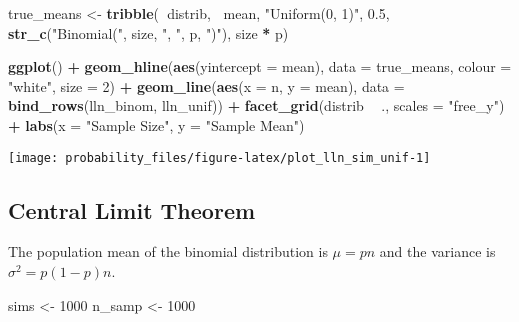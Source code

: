 \documentclass[]{book}
\newenvironment{Shaded}{\begin{snugshade}}{\end{snugshade}}
\newcommand{\DataTypeTok}[1]{\textcolor[rgb]{0.13,0.29,0.53}{#1}}
\newcommand{\DecValTok}[1]{\textcolor[rgb]{0.00,0.00,0.81}{#1}}
\newcommand{\FloatTok}[1]{\textcolor[rgb]{0.00,0.00,0.81}{#1}}
\newcommand{\KeywordTok}[1]{\textcolor[rgb]{0.13,0.29,0.53}{\textbf{#1}}}
\newcommand{\NormalTok}[1]{#1}
\newcommand{\OperatorTok}[1]{\textcolor[rgb]{0.81,0.36,0.00}{\textbf{#1}}}
\newcommand{\StringTok}[1]{\textcolor[rgb]{0.31,0.60,0.02}{#1}}
\theoremstyle{definition}
\theoremstyle{definition}
\theoremstyle{definition}
\theoremstyle{remark}
\begin{document}
\begin{Shaded}
\begin{Highlighting}[]
\NormalTok{true_means <-}
\StringTok{  }\KeywordTok{tribble}\NormalTok{(}\OperatorTok{~}\NormalTok{distrib, }\OperatorTok{~}\NormalTok{mean,}
          \StringTok{"Uniform(0, 1)"}\NormalTok{, }\FloatTok{0.5}\NormalTok{,}
          \KeywordTok{str_c}\NormalTok{(}\StringTok{"Binomial("}\NormalTok{, size, }\StringTok{", "}\NormalTok{, p, }\StringTok{")"}\NormalTok{), size }\OperatorTok{*}\StringTok{ }\NormalTok{p)}

\KeywordTok{ggplot}\NormalTok{() }\OperatorTok{+}
\StringTok{  }\KeywordTok{geom_hline}\NormalTok{(}\KeywordTok{aes}\NormalTok{(}\DataTypeTok{yintercept =}\NormalTok{ mean), }\DataTypeTok{data =}\NormalTok{ true_means,}
             \DataTypeTok{colour =} \StringTok{"white"}\NormalTok{, }\DataTypeTok{size =} \DecValTok{2}\NormalTok{) }\OperatorTok{+}
\StringTok{  }\KeywordTok{geom_line}\NormalTok{(}\KeywordTok{aes}\NormalTok{(}\DataTypeTok{x =}\NormalTok{ n, }\DataTypeTok{y =}\NormalTok{ mean),}
            \DataTypeTok{data =} \KeywordTok{bind_rows}\NormalTok{(lln_binom, lln_unif)) }\OperatorTok{+}
\StringTok{  }\KeywordTok{facet_grid}\NormalTok{(distrib }\OperatorTok{~}\StringTok{ }\NormalTok{., }\DataTypeTok{scales =} \StringTok{"free_y"}\NormalTok{) }\OperatorTok{+}
\StringTok{  }\KeywordTok{labs}\NormalTok{(}\DataTypeTok{x =} \StringTok{"Sample Size"}\NormalTok{, }\DataTypeTok{y =} \StringTok{"Sample Mean"}\NormalTok{)}
\end{Highlighting}
\end{Shaded}

\begin{center}\texttt{[image: probability\_files/figure-latex/plot\_lln\_sim\_unif-1]} \end{center}

\hypertarget{central-limit-theorem}{%
\subsection{Central Limit Theorem}\label{central-limit-theorem}}

The population mean of the binomial distribution is \(\mu = p n\) and
the variance is \(\sigma^2 = p (1 - p) n\).

\begin{Shaded}
\begin{Highlighting}[]
\NormalTok{sims <-}\StringTok{ }\DecValTok{1000}
\NormalTok{n_samp <-}\StringTok{ }\DecValTok{1000}
\end{Highlighting}
\end{Shaded}
\end{document}
